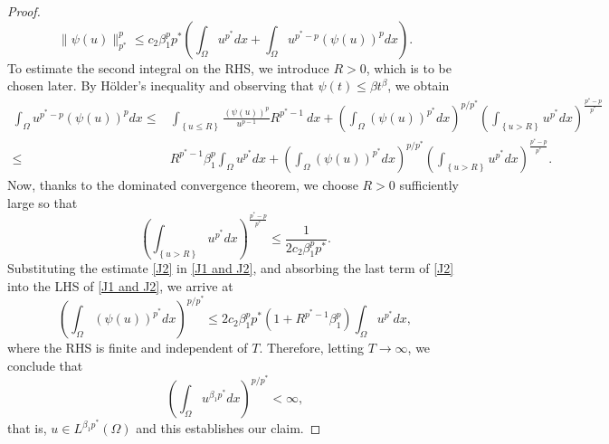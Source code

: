 \documentclass[reqno,oneside]{amsart}
\theoremstyle{definition}
\theoremstyle{remark}
\numberwithin{equation}{section}
\newcommand{\Om} {\Omega}
\newcommand{\rar}{\rightarrow}
\begin{document}
\begin{proof}
    \begin{equation}\label{J1 and J2}
        \|\psi (u)\|^p_{p^*} \leq c_2 \beta_1^p p^* \left( \int_{\Om} u^{p^*} dx + \int_{\Om} u^{p^* -p}\left(\psi (u)\right)^p dx \right).
    \end{equation}
    To estimate the second integral on the RHS, we introduce $R>0$, which is to be chosen later. By H\"older's inequality and observing that $\psi(t) \leq \beta t^{\beta}$, we obtain
    \begin{align}\label{J2}
        \int_{\Om} u^{p^* -p}\left(\psi (u)\right)^p dx\nonumber \leq &\int_{\left\{u\leq R\right\}} \frac{\left(\psi(u)\right)^p}{u^{p-1}} R^{p^* -1}\ dx + \left( \int_{\Om} \left( \psi (u)\right)^{p^*} dx \right)^{p/{p^*}} \left( \int_{\left\{u > R\right\}} u^{p^*} dx \right)^{\frac{p^* -p}{p^*}}\nonumber\\
        \leq &R^{p^* -1} \beta_1^p \int_{\Om} u^{p^*} dx + \left( \int_{\Om} \left( \psi (u)\right)^{p^*} dx \right)^{p/{p^*}} \left( \int_{\left\{u > R\right\}} u^{p^*} dx \right)^{\frac{p^* -p}{p^*}}.
    \end{align}
    Now, thanks to the dominated convergence theorem, we choose $R>0$ sufficiently large so that
    \[\left( \int_{\left\{u > R\right\}} u^{p^*} dx \right)^{\frac{p^* -p}{p^*}} \leq \frac{1}{2c_2 \beta_1^p p^*}.\]
    Substituting the estimate \eqref{J2} in \eqref{J1 and J2}, and absorbing the last term of \eqref{J2} into the LHS of \eqref{J1 and J2}, we arrive at
    \begin{equation*}
        \left(\int_{\Om} \left( \psi(u)\right)^{p^*} dx \right)^{p/p^*} \leq 2c_2 \beta_1^p p^* \left(1 + R^{p^* -1} \beta_1^p \right) \int_{\Om} u^{p^*} dx,
    \end{equation*}
    where the RHS is finite and independent of $T$. Therefore, letting $T\rar\infty$, we conclude that
    \begin{equation}
        \left( \int_{\Om} u^{\beta_1 p^*} dx \right)^{p/p^*} < \infty,
    \end{equation}
    that is, $u\in L^{\beta_1 p^*} (\Om)$ and this establishes our claim.


\end{proof}
\end{document}
